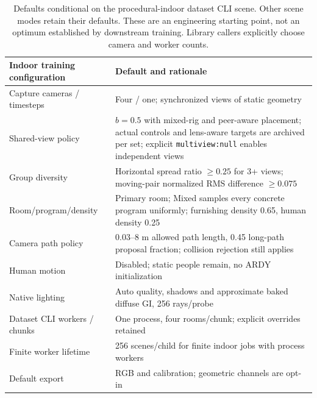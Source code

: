 \documentclass{article}
\begin{document}
\begin{table}[ht]
\centering\small
\begin{tabular}{p{.35\linewidth}p{.54\linewidth}}
\toprule
Indoor training configuration & Default and rationale\\\midrule
Capture cameras / timesteps & Four / one; synchronized views of static geometry\\
Shared-view policy & $b=0.5$ with mixed-rig and peer-aware placement; actual controls and lens-aware targets are archived per set; explicit \texttt{multiview:null} enables independent views\\
Group diversity & Horizontal spread ratio $\geq0.25$ for 3+ views; moving-pair normalized RMS difference $\geq0.075$\\
Room/program/density & Primary room; Mixed samples every concrete program uniformly; furnishing density 0.65, human density 0.25\\
Camera path policy & 0.03--8 m allowed path length, 0.45 long-path proposal fraction; collision rejection still applies\\
Human motion & Disabled; static people remain, no ARDY initialization\\
Native lighting & Auto quality, shadows and approximate baked diffuse GI, 256 rays/probe\\
Dataset CLI workers / chunks & One process, four rooms/chunk; explicit overrides retained\\
Finite worker lifetime & 256 scenes/child for finite indoor jobs with process workers\\
Default export & RGB and calibration; geometric channels are opt-in\\\bottomrule
\end{tabular}
\caption{Defaults conditional on the procedural-indoor dataset CLI scene. Other scene modes retain their defaults. These are an engineering starting point, not an optimum established by downstream training. Library callers explicitly choose camera and worker counts.}
\end{table}
\end{document}
